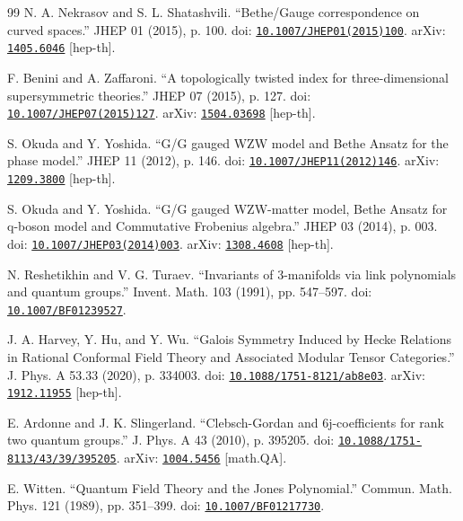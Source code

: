 \documentclass[11pt,a4paper]{article}
\numberwithin{equation}{section}
\begin{document}
\begin{thebibliography}{99}
N. A. Nekrasov and S. L. Shatashvili. ``Bethe/Gauge correspondence on curved spaces.'' JHEP 01 (2015), p. 100. doi: \href{https://doi.org/10.1007/JHEP01(2015)100}{\nolinkurl{10.1007/JHEP01(2015)100}}. arXiv: \href{https://arxiv.org/abs/1405.6046}{\nolinkurl{1405.6046}} [hep-th].

F. Benini and A. Zaffaroni. ``A topologically twisted index for three-dimensional supersymmetric theories.'' JHEP 07 (2015), p. 127. doi: \href{https://doi.org/10.1007/JHEP07(2015)127}{\nolinkurl{10.1007/JHEP07(2015)127}}. arXiv: \href{https://arxiv.org/abs/1504.03698}{\nolinkurl{1504.03698}} [hep-th].

S. Okuda and Y. Yoshida. ``G/G gauged WZW model and Bethe Ansatz for the phase model.'' JHEP 11 (2012), p. 146. doi: \href{https://doi.org/10.1007/JHEP11(2012)146}{\nolinkurl{10.1007/JHEP11(2012)146}}. arXiv: \href{https://arxiv.org/abs/1209.3800}{\nolinkurl{1209.3800}} [hep-th].

S. Okuda and Y. Yoshida. ``G/G gauged WZW-matter model, Bethe Ansatz for q-boson model and Commutative Frobenius algebra.'' JHEP 03 (2014), p. 003. doi: \href{https://doi.org/10.1007/JHEP03(2014)003}{\nolinkurl{10.1007/JHEP03(2014)003}}. arXiv: \href{https://arxiv.org/abs/1308.4608}{\nolinkurl{1308.4608}} [hep-th].

N. Reshetikhin and V. G. Turaev. ``Invariants of 3-manifolds via link polynomials and quantum groups.'' Invent. Math. 103 (1991), pp. 547--597. doi: \href{https://doi.org/10.1007/BF01239527}{\nolinkurl{10.1007/BF01239527}}.

J. A. Harvey, Y. Hu, and Y. Wu. ``Galois Symmetry Induced by Hecke Relations in Rational Conformal Field Theory and Associated Modular Tensor Categories.'' J. Phys. A 53.33 (2020), p. 334003. doi: \href{https://doi.org/10.1088/1751-8121/ab8e03}{\nolinkurl{10.1088/1751-8121/ab8e03}}. arXiv: \href{https://arxiv.org/abs/1912.11955}{\nolinkurl{1912.11955}} [hep-th].

E. Ardonne and J. K. Slingerland. ``Clebsch-Gordan and 6j-coefficients for rank two quantum groups.'' J. Phys. A 43 (2010), p. 395205. doi: \href{https://doi.org/10.1088/1751-8113/43/39/395205}{\nolinkurl{10.1088/1751-8113/43/39/395205}}. arXiv: \href{https://arxiv.org/abs/1004.5456}{\nolinkurl{1004.5456}} [math.QA].

E. Witten. ``Quantum Field Theory and the Jones Polynomial.'' Commun. Math. Phys. 121 (1989), pp. 351--399. doi: \href{https://doi.org/10.1007/BF01217730}{\nolinkurl{10.1007/BF01217730}}.


\end{thebibliography}
\end{document}
